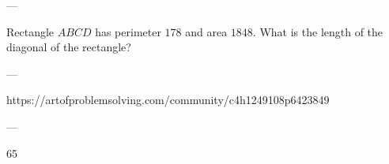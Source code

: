 
---

Rectangle $ABCD$ has perimeter $178$ and area $1848$. What is the length of the diagonal of the rectangle?

---

https://artofproblemsolving.com/community/c4h1249108p6423849

---

65
